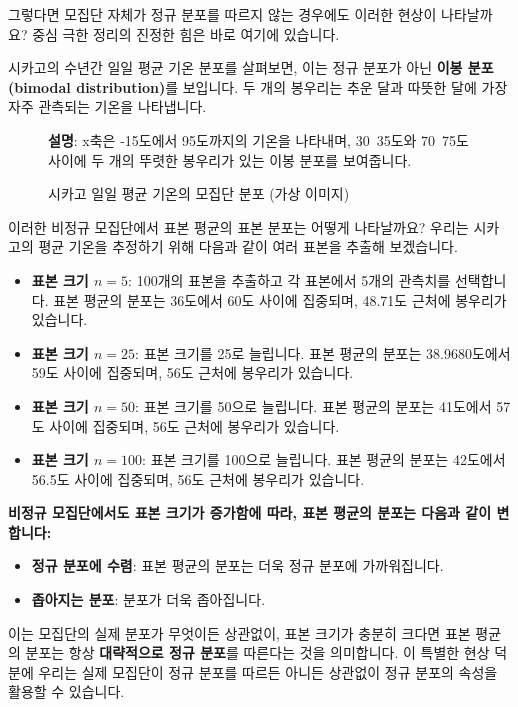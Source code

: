 \documentclass[11pt,a4paper]{article}
\theoremstyle{definition}
\begin{document}
그렇다면 모집단 자체가 정규 분포를 따르지 않는 경우에도 이러한 현상이 나타날까요? 중심 극한 정리의 진정한 힘은 바로 여기에 있습니다.

\begin{examplebox}[예시: 시카고 일일 평균 기온 분포]
시카고의 수년간 일일 평균 기온 분포를 살펴보면, 이는 정규 분포가 아닌 \textbf{이봉 분포(bimodal distribution)}를 보입니다. 두 개의 봉우리는 추운 달과 따뜻한 달에 가장 자주 관측되는 기온을 나타냅니다.

\begin{figure}[h!]
    \centering
    \caption{시카고 일일 평균 기온의 모집단 분포 (가상 이미지)}
    \label{fig:chicago_pop}
    \textbf{설명}: x축은 -15도에서 95도까지의 기온을 나타내며, 30~35도와 70~75도 사이에 두 개의 뚜렷한 봉우리가 있는 이봉 분포를 보여줍니다.
\end{figure}

이러한 비정규 모집단에서 표본 평균의 표본 분포는 어떻게 나타날까요? 우리는 시카고의 평균 기온을 추정하기 위해 다음과 같이 여러 표본을 추출해 보겠습니다.
\begin{itemize}
    \item \textbf{표본 크기 $n=5$}: 100개의 표본을 추출하고 각 표본에서 5개의 관측치를 선택합니다. 표본 평균의 분포는 36도에서 60도 사이에 집중되며, 48.71도 근처에 봉우리가 있습니다.
    \item \textbf{표본 크기 $n=25$}: 표본 크기를 25로 늘립니다. 표본 평균의 분포는 38.9680도에서 59도 사이에 집중되며, 56도 근처에 봉우리가 있습니다.
    \item \textbf{표본 크기 $n=50$}: 표본 크기를 50으로 늘립니다. 표본 평균의 분포는 41도에서 57도 사이에 집중되며, 56도 근처에 봉우리가 있습니다.
    \item \textbf{표본 크기 $n=100$}: 표본 크기를 100으로 늘립니다. 표본 평균의 분포는 42도에서 56.5도 사이에 집중되며, 56도 근처에 봉우리가 있습니다.
\end{itemize}
\end{examplebox}

\begin{summarybox}
\textbf{비정규 모집단에서도 표본 크기가 증가함에 따라, 표본 평균의 분포는 다음과 같이 변합니다:}
\begin{itemize}
    \item \textbf{정규 분포에 수렴}: 표본 평균의 분포는 더욱 정규 분포에 가까워집니다.
    \item \textbf{좁아지는 분포}: 분포가 더욱 좁아집니다.
\end{itemize}
이는 모집단의 실제 분포가 무엇이든 상관없이, 표본 크기가 충분히 크다면 표본 평균의 분포는 항상 \textbf{대략적으로 정규 분포}를 따른다는 것을 의미합니다. 이 특별한 현상 덕분에 우리는 실제 모집단이 정규 분포를 따르든 아니든 상관없이 정규 분포의 속성을 활용할 수 있습니다.
\end{summarybox}
\end{document}
